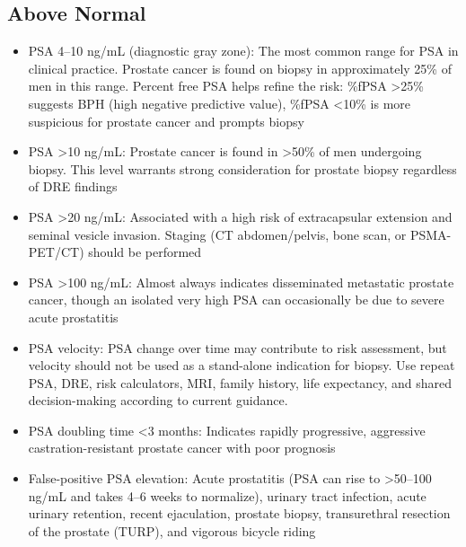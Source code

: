 \subsection*{Above Normal}
\begin{itemize}
  \item PSA 4--10 ng/mL (diagnostic gray zone): The most common range for PSA in clinical practice. Prostate cancer is found on biopsy in approximately 25\% of men in this range. Percent free PSA helps refine the risk: \%fPSA >25\% suggests BPH (high negative predictive value), \%fPSA <10\% is more suspicious for prostate cancer and prompts biopsy
  \item PSA >10 ng/mL: Prostate cancer is found in >50\% of men undergoing biopsy. This level warrants strong consideration for prostate biopsy regardless of DRE findings
  \item PSA >20 ng/mL: Associated with a high risk of extracapsular extension and seminal vesicle invasion. Staging (CT abdomen/pelvis, bone scan, or PSMA-PET/CT) should be performed
  \item PSA >100 ng/mL: Almost always indicates disseminated metastatic prostate cancer, though an isolated very high PSA can occasionally be due to severe acute prostatitis
  \item PSA velocity: PSA change over time may contribute to risk assessment, but velocity should not be used as a stand-alone indication for biopsy. Use repeat PSA, DRE, risk calculators, MRI, family history, life expectancy, and shared decision-making according to current guidance.
  \item PSA doubling time <3 months: Indicates rapidly progressive, aggressive castration-resistant prostate cancer with poor prognosis
  \item False-positive PSA elevation: Acute prostatitis (PSA can rise to >50--100 ng/mL and takes 4--6 weeks to normalize), urinary tract infection, acute urinary retention, recent ejaculation, prostate biopsy, transurethral resection of the prostate (TURP), and vigorous bicycle riding
\end{itemize}

